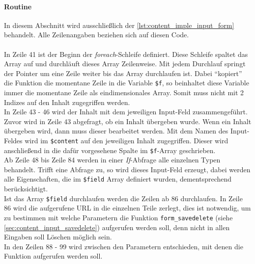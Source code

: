

\paragraph{Routine\\}
In diesem Abschnitt wird ausschließlich der \autoref{lst:content_imple_input_form} behandelt. Alle Zeilenangaben beziehen sich auf diesen Code.\\
\\
In Zeile 41 ist der Beginn der \textit{foreach}-Schleife definiert. Diese Schleife spaltet das Array auf und durchläuft dieses Array Zeilenweise. Mit jedem Durchlauf springt der Pointer um eine Zeile weiter bis das Array durchlaufen ist. Dabei \enquote{kopiert} die Funktion die momentane Zeile in die Variable \texttt{\$f}, so beinhaltet diese Variable immer die momentane Zeile als eindimensionales Array. Somit muss nicht mit 2 Indizes auf den Inhalt zugegriffen werden.\\
In Zeile 43 - 46 wird der Inhalt mit dem jeweiligen Input-Feld zusammengeführt. Zuvor wird in Zeile 43 abgefragt, ob ein Inhalt übergeben wurde. Wenn ein Inhalt übergeben wird, dann muss dieser bearbeitet werden. Mit dem Namen des Input-Feldes wird im \texttt{\$content} auf den jeweiligen Inhalt zugegriffen. Dieser wird anschließend in die dafür vorgesehene Spalte im \texttt{\$f}-Array geschrieben.\\
Ab Zeile 48 bis Zeile 84 werden in einer \textit{If}-Abfrage alle einzelnen Typen behandelt. Trifft eine Abfrage zu, so wird dieses Input-Feld erzeugt, dabei werden alle Eigenschaften, die im \texttt{\$field} Array definiert wurden, dementsprechend berücksichtigt.\\
Ist das Array \texttt{\$field} durchlaufen werden die Zeilen ab 86 durchlaufen. In Zeile 86 wird die aufgerufene URL in die einzelnen Teile zerlegt, dies ist notwendig, um zu bestimmen mit welche Parametern die Funktion \texttt{form\_savedelete} (siehe \autoref{sec:content_input_savedelete}) aufgerufen werden soll, denn nicht in allen Eingaben soll Löschen möglich sein.\\
In den Zeilen 88 - 99 wird zwischen den Parametern entschieden, mit denen die Funktion aufgerufen werden soll.

